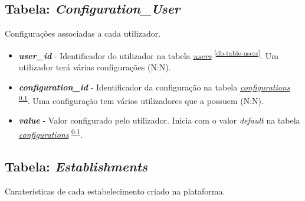 \documentclass[11pt, a4paper, sans]{article}
\begin{document}
	\subsection{Tabela: \textit{Configuration\_User}} \label{db-table-configuration-user}

	Configurações associadas a cada utilizador.

	\begin{itemize}
		\item \textbf{\textit{user\_id}} - Identificador do utilizador na tabela \underline{\textit{users}} \textsuperscript{\ref{db-table-users}}. Um utilizador terá várias configurações (N:N).
		\item \textbf{\textit{configuration\_id}} - Identificador da configuração na tabela \underline{\textit{configurations}} \textsuperscript{\ref{db-table-configuration-user}}. Uma configuração tem vários utilizadores que a possuem (N:N).
		\item \textbf{\textit{value}} - Valor configurado pelo utilizador. Inicia com o valor \textit{default} na tabela \underline{\textit{configurations}} \textsuperscript{\ref{db-table-configuration-user}}.
	\end{itemize}

	\subsection{Tabela: \textit{Establishments}} \label{db-table-establishments}

	Caraterísticas de cada estabelecimento criado na plataforma.
\end{document}
